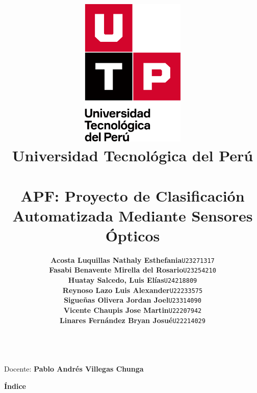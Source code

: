 \documentclass{article}
\title{
  \pagenumbering{gobble}
  \vspace{1cm}
  \includegraphics[width=5cm,clip,trim=0cm 2.9cm 0cm 0cm]{./assets/isotipo-utp.png} \\
  \vspace{0.5cm}
  \textbf{Universidad Tecnológica del Perú} \\
  \vspace{0.5cm}
  \text{Investigación Académica} \\
  \vspace{1cm}
    {\huge \textbf{APF: Proyecto de Clasificación Automatizada Mediante Sensores Ópticos}} \\
  \vspace{1cm}
}
\author{
  \begin{tabular}{ll}
    \textbf{Acosta Luquillas Nathaly Esthefania} & \texttt{U23271317} \\
    \textbf{Fasabi Benavente Mirella del Rosario} & \texttt{U23254210} \\
    \textbf{Huatay Salcedo, Luis Elías} & \texttt{U24218809} \\
    \textbf{Reynoso Lazo Luis Alexander} & \texttt{U22233575} \\
    \textbf{Sigueñas Olivera Jordan Joel} & \texttt{U23314090} \\
    \textbf{Vicente Chaupis Jose Martin} & \texttt{U22207942} \\
    \textbf{Linares Fernández Bryan Josué} & \texttt{U22214029} \\
  \end{tabular} \\
}
\begin{document}
\maketitle
\begin{center}
  Docente: \textbf{Pablo Andrés Villegas Chunga} \\
\end{center}

%
%

\newpage

\begin{center}
\Large\bfseries Índice
\end{center}
\begingroup
\let\clearpage\relax
\renewcommand{\contentsname}{}
\tableofcontents
\endgroup


\newpage
\setcounter{page}{1}  


\end{document}
